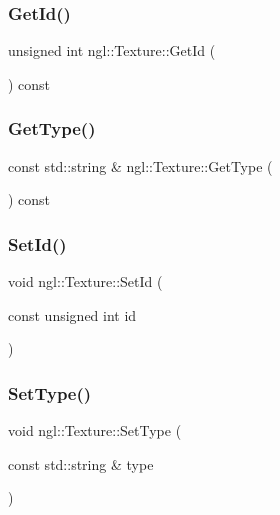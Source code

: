 \mbox{\label{classngl_1_1_texture_ab84f9e0cce00fb6d61fcbe261bba9c43}} 
\subsubsection{\texorpdfstring{Get\+Id()}{GetId()}}
{\footnotesize\ttfamily unsigned int ngl\+::\+Texture\+::\+Get\+Id (\begin{DoxyParamCaption}{ }\end{DoxyParamCaption}) const}

\mbox{\label{classngl_1_1_texture_a448ce26648588cd6f5a37593282783c9}} 
\subsubsection{\texorpdfstring{Get\+Type()}{GetType()}}
{\footnotesize\ttfamily const std\+::string \& ngl\+::\+Texture\+::\+Get\+Type (\begin{DoxyParamCaption}{ }\end{DoxyParamCaption}) const}

\mbox{\label{classngl_1_1_texture_ada86f445db952a269db8aa4a02226137}} 
\subsubsection{\texorpdfstring{Set\+Id()}{SetId()}}
{\footnotesize\ttfamily void ngl\+::\+Texture\+::\+Set\+Id (\begin{DoxyParamCaption}\item[{const unsigned int}]{id }\end{DoxyParamCaption})}

\mbox{\label{classngl_1_1_texture_a748c9ca0e943af5fd3a3f33270c3a5f1}} 
\subsubsection{\texorpdfstring{Set\+Type()}{SetType()}}
{\footnotesize\ttfamily void ngl\+::\+Texture\+::\+Set\+Type (\begin{DoxyParamCaption}\item[{const std\+::string \&}]{type }\end{DoxyParamCaption})}

